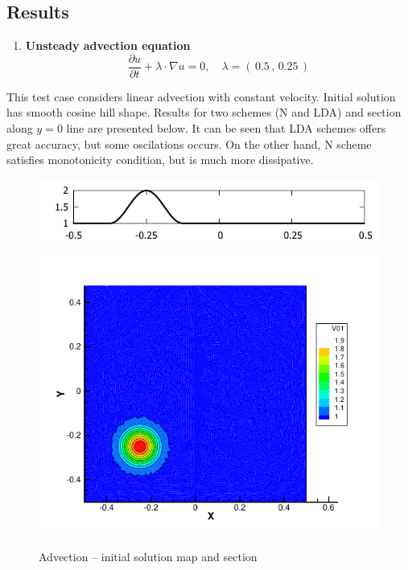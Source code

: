 \documentclass[plainboxedsections, 17pt, b1]{sciposter}
\newcommand{\fracpd}[2]{\frac{\partial #1}{\partial #2}}
\begin{document}
\begin{multicols}{3}
\section{Results}

\begin{enumerate}
	\item \textbf{Unsteady advection equation}
		\[ \fracpd{u}{t} + \lambda \cdot \nabla u = 0, \quad \lambda = ( \, 0.5 \, , \, 0.25 \,  ) \]
\end{enumerate}
This test case considers linear advection with constant velocity. Initial solution has smooth cosine hill shape. Results for two schemes (N and LDA) and section along $y=0$ line are presented below. It can be seen that LDA schemes offers great accuracy, but some oscilations occurs. On the other hand, N scheme satisfies monotonicity condition, but is much more dissipative.

\begin{figure}%
	\centering
	\includegraphics[width=0.45\columnwidth]{img/advect_initial_cosine.pdf} \\
	\includegraphics[width=0.45\columnwidth]{img/advect_initial_cosine_map.pdf}%
	\caption{Advection -- initial solution map and section }%
\end{figure}


\end{multicols}
\end{document}
